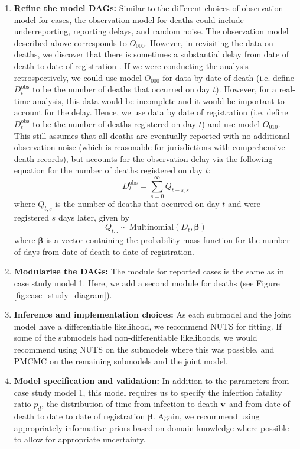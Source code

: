 \documentclass{article}
\begin{document}
\begin{enumerate}
\item \textbf{Refine the model DAGs:}       
    Similar to the different choices of observation model for cases, the observation model for deaths could include underreporting, reporting delays, and random noise. The observation model described above corresponds to $O_{000}$. However, in revisiting the data on deaths, we discover that there is sometimes a substantial delay from date of death to date of registration \citep{seaman2022nowcasting}. If we were conducting the analysis retrospectively, we could use model $O_{000}$ for data by date of death (i.e. define $D^\mathrm{obs}_t$ to be the number of deaths that occurred on day $t$). However, for a real-time analysis, this data would be incomplete and it would be important to account for the delay. Hence, we use data by date of registration (i.e. define $D^\mathrm{obs}_t$ to be the number of deaths registered on day $t$) and use model $O_{010}$. This still assumes that all deaths are eventually reported with no additional observation noise (which is reasonable for jurisdictions with comprehensive death records), but accounts for the observation delay via the following equation for the number of deaths registered on day $t$:
\begin{equation}
    D^\mathrm{obs}_t = \sum_{s=0}^\infty Q_{t-s,s}
\end{equation}
where $Q_{t,s}$ is the number of deaths that occurred on day $t$ and were registered $s$ days later, given by
\begin{equation}
    Q_{t,.} \sim \mathrm{Multinomial}\left( D_t, \boldsymbol{\beta}\right) 
\end{equation}
where $\boldsymbol{\beta}$ is a vector containing the probability mass function for the number of days from date of death to date of registration.

 \item \textbf{Modularise the DAGs:} The module for reported cases is the same as in case study model 1. Here, we add a second module for deaths (see Figure \ref{fig:case_study_diagram}).

\item \textbf{Inference and implementation choices:} As each submodel and the joint model have a differentiable likelihood, we recommend \ac{NUTS} for fitting. If some of the submodels had non-differentiable likelihoods, we would recommend using \ac{NUTS} on the submodels where this was possible, and \ac{PMCMC} on the remaining submodels and the joint model.

\item \textbf{Model specification and validation:} In addition to the parameters from case study model 1, this model requires us to specify the infection fatality ratio $p_d$, the distribution of time from infection to death $\bf{v}$ and from date of death to date to date of registration $\boldsymbol{\beta}$. Again, we recommend using appropriately informative priors based on domain knowledge where possible to allow for appropriate uncertainty. 



\end{enumerate}
\end{document}
